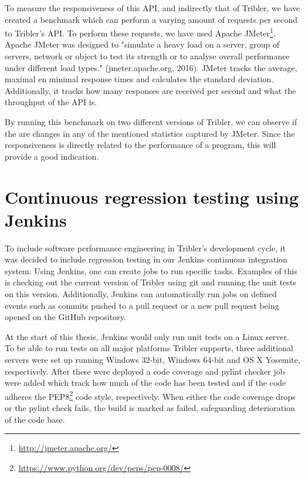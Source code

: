 To measure the responsiveness of this API, and indirectly that of Tribler, we have created a benchmark which can perform a varying amount of requests per second to Tribler's API.
To perform these requests, we have used Apache JMeter\footnote{\url{http://jmeter.apache.org/}}.
Apache JMeter was designed to "simulate a heavy load on a server, group of servers, network or object to test its strength or to analyse overall performance under different load types." (jmeter.apache.org, 2016).
JMeter tracks the average, maximal en minimal response times and calculates the standard deviation.
Additionally, it tracks how many responses are received per second and what the throughput of the API is.

By running this benchmark on two different versions of Tribler, we can observe if the are changes in any of the mentioned statistics captured by JMeter.
Since the responsiveness is directly related to the performance of a program, this will provide a good indication.


\section{Continuous regression testing using Jenkins}



To include software performance engineering in Tribler's development cycle, it was decided to include regression testing in our Jenkins continuous integration system.
Using Jenkins, one can create jobs to run specific tasks.
Examples of this is checking out the current version of Tribler using git and running the unit tests on this version.
Additionally, Jenkins can automatically run jobs on defined events such as commits pushed to a pull request or a new pull request being opened on the GitHub repository.

At the start of this thesis, Jenkins would only run unit tests on a Linux server.
To be able to run tests on all major platforms Tribler supports, three additional servers were set up running Windows 32-bit, Windows 64-bit and OS X Yosemite, respectively.
After these were deployed a code coverage and pylint checker job were added which track how much of the code has been tested and if the code adheres the PEP8\footnote{\url{https://www.python.org/dev/peps/pep-0008/}} code style, respectively.
When either the code coverage drops or the pylint check fails, the build is marked as failed, safeguarding deterioration of the code base.

